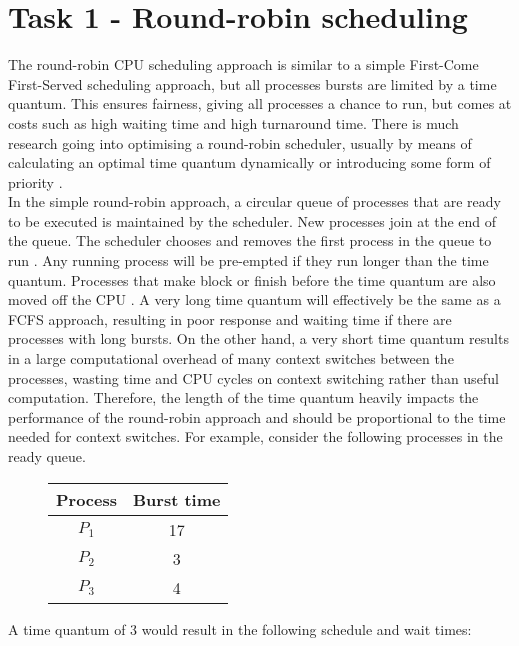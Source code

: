 \documentclass{article}
\newcommand{\n}[0]{\\[\baselineskip]}
\begin{document}
\section{Task 1 - Round-robin scheduling}
The round-robin CPU scheduling approach is similar to a simple First-Come First-Served scheduling approach, but all processes bursts are limited by a time quantum. This ensures fairness, giving all processes a chance to run, but comes at costs such as high waiting time and high turnaround time. There is much research going into optimising a round-robin scheduler, usually by means of calculating an optimal time quantum dynamically \cite{rr-paper3} \cite{rr-paper4} \cite{rr-paper2} or introducing some form of priority \cite{rr-paper5}.
\n
In the simple round-robin approach, a circular queue of processes that are ready to be executed is maintained by the scheduler. New processes join at the end of the queue. The scheduler chooses and removes the first process in the queue to run \cite{os}. Any running process will be pre-empted if they run longer than the time quantum. Processes that make block or finish before the time quantum are also moved off the CPU \cite{rr-paper}. A very long time quantum will effectively be the same as a FCFS approach, resulting in poor response and waiting time if there are processes with long bursts. On the other hand, a very short time quantum results in a large computational overhead of many context switches between the processes, wasting time and CPU cycles on context switching \cite{context-switch} rather than useful computation. Therefore, the length of the time quantum heavily impacts the performance of the round-robin approach and should be proportional to the time needed for context switches. For example, consider the following processes in the ready queue.
\begin{figure}[H]
\centering
\begin{tabular}{c c}
\textbf{Process} & \textbf{Burst time} \\
\hline
$P_{1}$ & 17 \\
$P_{2}$ & 3 \\
$P_{3}$ & 4 \\
\end{tabular}
\end{figure}
\noindent 
A time quantum of 3 would result in the following schedule and wait times:
\end{document}
